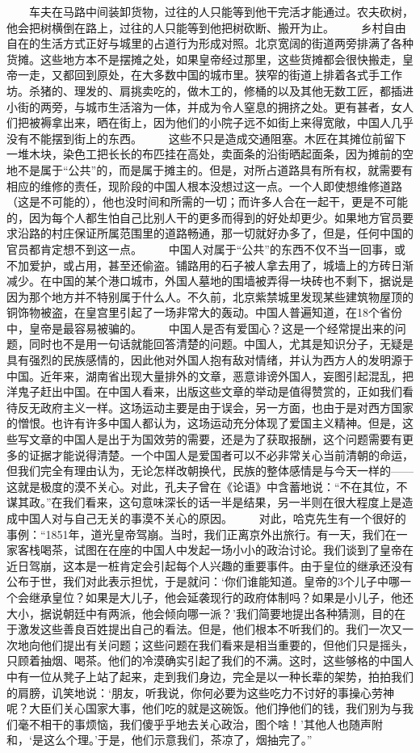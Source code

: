 \documentclass[12pt,oneside]{book}
\begin{document}
\begin{common-format}
　　车夫在马路中间装卸货物，过往的人只能等到他干完活才能通过。农夫砍树，他会把树横倒在路上，过往的人只能等到他把树砍断、搬开为止。 
　　乡村自由自在的生活方式正好与城里的占道行为形成对照。北京宽阔的街道两旁排满了各种货摊。这些地方本不是摆摊之处，如果皇帝经过那里，这些货摊都会很快搬走，皇帝一走，又都回到原处，在大多数中国的城市里。狭窄的街道上排着各式手工作坊。杀猪的、理发的、肩挑卖吃的，做木工的，修桶的以及其他无数工匠，都插进小街的两旁，与城市生活溶为一体，并成为令人窒息的拥挤之处。更有甚者，女人们把被褥拿出来，晒在街上，因为他们的小院子远不如街上来得宽敞，中国人几乎没有不能摆到街上的东西。 
　　这些不只是造成交通阻塞。木匠在其摊位前留下一堆木块，染色工把长长的布匹挂在高处，卖面条的沿街晒起面条，因为摊前的空地不是属于“公共”的，而是属于摊主的。但是，对所占道路具有所有权，就需要有相应的维修的责任，现阶段的中国人根本没想过这一点。一个人即使想维修道路（这是不可能的），他也没时间和所需的一切；而许多人合在一起干，更是不可能的，因为每个人都生怕自己比别人干的更多而得到的好处却更少。如果地方官员要求沿路的村庄保证所属范围里的道路畅通，那一切就好办多了，但是，任何中国的官员都肯定想不到这一点。 
　　中国人对属于“公共”的东西不仅不当一回事，或不加爱护，或占用，甚至还偷盗。铺路用的石子被人拿去用了，城墙上的方砖日渐减少。在中国的某个港口城市，外国人墓地的围墙被弄得一块砖也不剩下，据说是因为那个地方并不特别属于什么人。不久前，北京紫禁城里发现某些建筑物屋顶的铜饰物被盗，在皇宫里引起了一场非常大的轰动。中国人普遍知道，在18个省份中，皇帝是最容易被骗的。 
　　中国人是否有爱国心？这是一个经常提出来的问题，同时也不是用一句话就能回答清楚的问题。中国人，尤其是知识分子，无疑是具有强烈的民族感情的，因此他对外国人抱有敌对情绪，并认为西方人的发明源于中国。近年来，湖南省出现大量排外的文章，恶意诽谤外国人，妄图引起混乱，把洋鬼子赶出中国。在中国人看来，出版这些文章的举动是值得赞赏的，正如我们看待反无政府主义一样。这场运动主要是由于误会，另一方面，也由于是对西方国家的憎恨。也许有许多中国人都认为，这场运动充分体现了爱国主义精神。但是，这些写文章的中国人是出于为国效劳的需要，还是为了获取报酬，这个问题需要有更多的证据才能说得清楚。一个中国人是爱国者可以不必非常关心当前清朝的命运，但我们完全有理由认为，无论怎样改朝换代，民族的整体感情是与今天一样的——这就是极度的漠不关心。对此，孔夫子曾在《论语》中含蓄地说：“不在其位，不谋其政。”在我们看来，这句意味深长的话一半是结果，另一半则在很大程度上是造成中国人对与自己无关的事漠不关心的原因。 
　　对此，哈克先生有一个很好的事例：“1851年，道光皇帝驾崩。当时，我们正离京外出旅行。有一天，我们在一家客栈喝茶，试图在在座的中国人中发起一场小小的政治讨论。我们谈到了皇帝在近日驾崩，这本是一桩肯定会引起每个人兴趣的重要事件。由于皇位的继承还没有公布于世，我们对此表示担忧，于是就问：‘你们谁能知道。皇帝的3个儿子中哪一个会继承皇位？如果是大儿子，他会延袭现行的政府体制吗？如果是小儿子，他还大小，据说朝廷中有两派，他会倾向哪一派？’我们简要地提出各种猜测，目的在于激发这些善良百姓提出自己的看法。但是，他们根本不听我们的。我们一次又一次地向他们提出有关问题；这些问题在我们看来是相当重要的，但他们只是摇头，只顾着抽烟、喝茶。他们的冷漠确实引起了我们的不满。这时，这些够格的中国人中有一位从凳子上站了起来，走到我们身边，完全是以一种长辈的架势，拍拍我们的肩膀，讥笑地说：‘朋友，听我说，你何必要为这些吃力不讨好的事操心劳神呢？大臣们关心国家大事，他们吃的就是这碗饭。他们挣他们的钱，我们别为与我们毫不相干的事烦恼，我们傻乎乎地去关心政治，图个啥！’其他人也随声附和，‘是这么个理。’于是，他们示意我们，茶凉了，烟抽完了。” 

\end{common-format}
\end{document}
